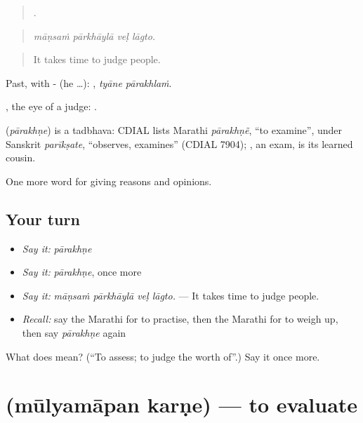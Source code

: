 \begin{quote}
   .
\end{quote}

\begin{quote}
\emph{māṇsaṁ pārkhāylā veḷ lāgto.}
\end{quote}

\begin{quote}
It takes time to judge people.
\end{quote}

Past, with - (he …):  , \emph{tyāne pārakhlaṁ}.

, the eye of a judge:    .

\begin{cousinweb}
\textbf{} (\emph{pārakhṇe}) is a tadbhava: CDIAL lists Marathi \emph{pārakhṇẽ}, \textquotedblleft{}to examine\textquotedblright{}, under Sanskrit \emph{parīkṣate}, \textquotedblleft{}observes, examines\textquotedblright{} (CDIAL 7904); , an exam, is its learned cousin.
\end{cousinweb}

\begin{grammarlens}[title={What you've built}]
One more word for giving reasons and opinions.
\end{grammarlens}

\subsection*{Your turn}
\begin{itemize}
\raggedright
  \item \emph{Say it:} \emph{pārakhṇe}
  \item \emph{Say it:} \emph{pārakhṇe}, once more
  \item \emph{Say it:} \emph{māṇsaṁ pārkhāylā veḷ lāgto.} — It takes time to judge people.
  \item \emph{Recall:} say the Marathi for to practise, then the Marathi for to weigh up, then say \emph{pārakhṇe} again
\end{itemize}

\begin{tcolorbox}[breakable,colback=teal!4,colframe=teal!35!black,title={Before you move on}]
What does  mean? (\textquotedblleft{}To assess; to judge the worth of\textquotedblright{}.) Say it once more.
\end{tcolorbox}
\section[\texorpdfstring{\mr{मूल्यमापन} \mr{करणे} (mūlyamāpan karṇe)}{मूल्यमापन करणे (mūlyamāpan karṇe)}]{  (mūlyamāpan karṇe) — to evaluate}

